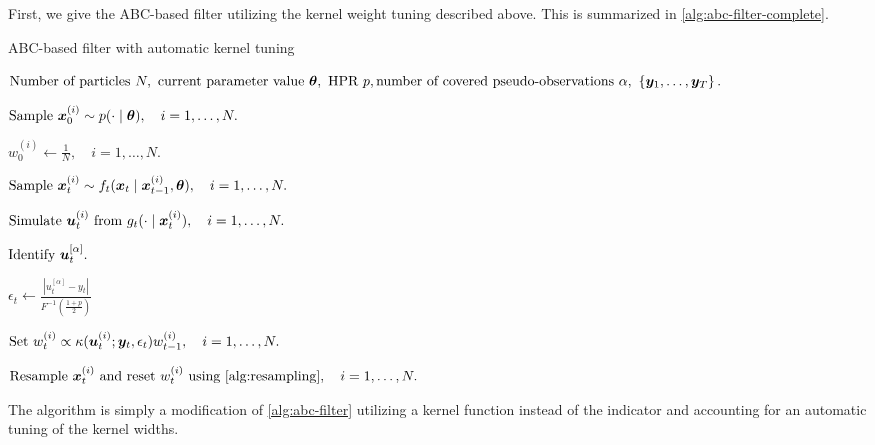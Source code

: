 First, we give the ABC-based filter utilizing the kernel weight tuning described above. This is summarized in \autoref{alg:abc-filter-complete}.
\begin{algorithm}[ht]
    \caption{ABC-based filter with automatic kernel tuning}
    \label{alg:abc-filter-complete}
    \begin{algorithmic}[1]
        \Input $\text{Number of particles } N,\ \text{current parameter value } \btheta, \text{ HPR } p, \newline \text{number of covered pseudo-observations } \alpha,\ \left\{\by_1, \ldots, \by_T\right\}.$
        
        \State $\text{Sample } \bm{x}_0^{(i)} \sim p(\cdot \mid \bm{\theta}), \quad i = 1, \ldots, N.$ 
        
        \State $w_0^{(i)} \gets \frac{1}{N}, \quad i = 1, \ldots, N.$ 
        
        \State $\text{Sample } \bm{x}_t^{(i)} \sim f_t(\bm{x}_t \mid \bm{x}_{t-1}^{(i)}, \bm{\theta}), \quad i = 1, \ldots, N.$ 
        
        \State $\text{Simulate } \bm{u}_t^{(i)} \text{ from } g_t(\cdot \mid \bm{x}_t^{(i)}), \quad i = 1, \ldots, N.$ 
        
        \State $\text{Identify } \bm{u}_t^{[\alpha]}.$ 
        
        \State $\epsilon_t \gets \frac{\left| u_t^{[\alpha]} - y_t \right|}{F^{-1}(\frac{1+p}{2})}$ 
        
        \State $\text{Set } w_t^{(i)} \propto \kappa(\bm{u}_t^{(i)}; \bm{y}_t, \epsilon_t) w_{t-1}^{(i)}, \quad i = 1, \ldots, N.$
        
        \State $\text{Resample } \bx_t^{(i)} \text{ and reset } w_t^{(i)} \text{ using \autoref{alg:resampling}}, \quad i = 1, \ldots, N.$
        \EndFor
    \end{algorithmic}
\end{algorithm}
The algorithm is simply a modification of \autoref{alg:abc-filter} utilizing a kernel function instead of the indicator and accounting for an automatic tuning of the kernel widths.

